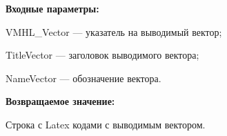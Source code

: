 \textbf{Входные параметры:}
 
VMHL\_Vector --- указатель на выводимый вектор;
 
TitleVector --- заголовок выводимого вектора;
 
NameVector --- обозначение вектора.
	
\textbf{Возвращаемое значение:}

Строка с Latex кодами с выводимым вектором.